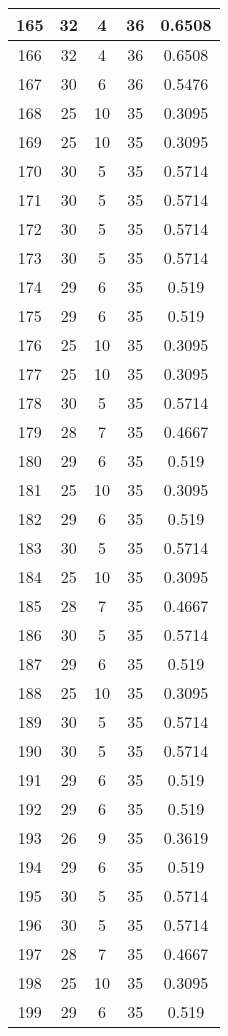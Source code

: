 \documentclass[letterpaper, 12pt]{article}
\begin{document}
\begin{longtable}{|c|c|c|c|c|}
\hline
165 & 32 & 4 & 36 & 0.6508 \\
\hline
166 & 32 & 4 & 36 & 0.6508 \\
\hline
167 & 30 & 6 & 36 & 0.5476 \\
\hline
168 & 25 & 10 & 35 & 0.3095 \\
\hline
169 & 25 & 10 & 35 & 0.3095 \\
\hline
170 & 30 & 5 & 35 & 0.5714 \\
\hline
171 & 30 & 5 & 35 & 0.5714 \\
\hline
172 & 30 & 5 & 35 & 0.5714 \\
\hline
173 & 30 & 5 & 35 & 0.5714 \\
\hline
174 & 29 & 6 & 35 & 0.519 \\
\hline
175 & 29 & 6 & 35 & 0.519 \\
\hline
176 & 25 & 10 & 35 & 0.3095 \\
\hline
177 & 25 & 10 & 35 & 0.3095 \\
\hline
178 & 30 & 5 & 35 & 0.5714 \\
\hline
179 & 28 & 7 & 35 & 0.4667 \\
\hline
180 & 29 & 6 & 35 & 0.519 \\
\hline
181 & 25 & 10 & 35 & 0.3095 \\
\hline
182 & 29 & 6 & 35 & 0.519 \\
\hline
183 & 30 & 5 & 35 & 0.5714 \\
\hline
184 & 25 & 10 & 35 & 0.3095 \\
\hline
185 & 28 & 7 & 35 & 0.4667 \\
\hline
186 & 30 & 5 & 35 & 0.5714 \\
\hline
187 & 29 & 6 & 35 & 0.519 \\
\hline
188 & 25 & 10 & 35 & 0.3095 \\
\hline
189 & 30 & 5 & 35 & 0.5714 \\
\hline
190 & 30 & 5 & 35 & 0.5714 \\
\hline
191 & 29 & 6 & 35 & 0.519 \\
\hline
192 & 29 & 6 & 35 & 0.519 \\
\hline
193 & 26 & 9 & 35 & 0.3619 \\
\hline
194 & 29 & 6 & 35 & 0.519 \\
\hline
195 & 30 & 5 & 35 & 0.5714 \\
\hline
196 & 30 & 5 & 35 & 0.5714 \\
\hline
197 & 28 & 7 & 35 & 0.4667 \\
\hline
198 & 25 & 10 & 35 & 0.3095 \\
\hline
199 & 29 & 6 & 35 & 0.519 \\
\hline
\end{longtable}
\end{document}
